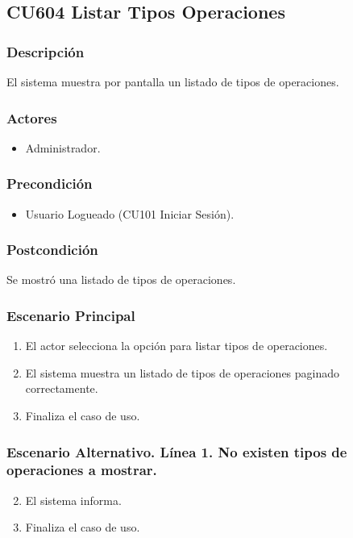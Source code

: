 \subsection{CU604 Listar Tipos Operaciones}
\subsubsection{Descripci\'{o}n}
El sistema muestra por pantalla un listado de tipos de operaciones.
\subsubsection{Actores}
\begin{itemize}
\item Administrador.
\end{itemize}
\subsubsection{Precondici\'{o}n}
\begin{itemize}
\item Usuario Logueado (CU101 Iniciar Sesi\'{o}n).
\end{itemize}
\subsubsection{Postcondici\'{o}n}
Se mostr\'{o} una listado de tipos de operaciones.
\subsubsection{Escenario Principal}
\begin{enumerate}
\item El actor selecciona la opci\'{o}n para listar tipos de operaciones.
\item El sistema muestra un listado de tipos de operaciones paginado correctamente.
\item Finaliza el caso de uso.
\end{enumerate}
\subsubsection{Escenario Alternativo. L\'{i}nea 1. No existen tipos de operaciones a mostrar.}
\begin{enumerate}
\setcounter{enumi}{1}
\item El sistema informa.
\item Finaliza el caso de uso.
\end{enumerate}